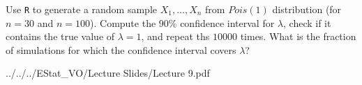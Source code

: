 
\begin{exercise}

Use \texttt R to generate a random sample $X_1, \dots, X_n$ from $\mathit{Pois}(1)$ distribution (for $n = 30$ and $n = 100$).
Compute the $90 \%$ confidence interval for $\lambda$, check if it contains the true value of $\lambda = 1$, and repeat ths $10 000$ times.
What is the fraction of simulations for which the confidence interval covers $\lambda$?

\end{exercise}


\begin{solution}

\phantom{}


{../../../EStat_VO/Lecture Slides/Lecture 9.pdf}



\end{solution}

